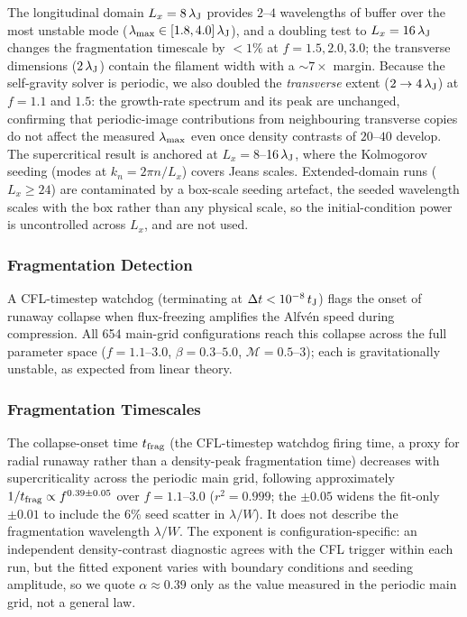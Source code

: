 \documentclass[usenatbib,twoside,twocolumn]{mnras}
\begin{document}
The longitudinal domain $L_x=8\,\lambda_{\rm J}$ provides $2$--$4$ wavelengths of buffer over the most unstable mode ($\lambda_{\rm max}\in[1.8,4.0]\,\lambda_{\rm J}$), and a doubling test to $L_x=16\,\lambda_{\rm J}$ changes the fragmentation timescale by $<1\%$ at $f=1.5,2.0,3.0$; the transverse dimensions ($2\,\lambda_{\rm J}$) contain the filament width with a $\sim7\times$ margin. Because the self-gravity solver is periodic, we also doubled the \emph{transverse} extent ($2\to4\,\lambda_{\rm J}$) at $f=1.1$ and $1.5$: the growth-rate spectrum and its peak are unchanged, confirming that periodic-image contributions from neighbouring transverse copies do not affect the measured $\lambda_{\rm max}$ even once density contrasts of $20$--$40$ develop. The supercritical result is anchored at $L_x=8$--$16\,\lambda_{\rm J}$, where the Kolmogorov seeding (modes at $k_n=2\pi n/L_x$) covers Jeans scales. Extended-domain runs ($L_x\geq24$) are contaminated by a box-scale seeding artefact, the seeded wavelength scales with the box rather than any physical scale, so the initial-condition power is uncontrolled across $L_x$, and are not used.

\subsubsection{Fragmentation Detection}

A CFL-timestep watchdog (terminating at $\Delta t<10^{-8}\,t_{\rm J}$) flags the onset of runaway collapse when flux-freezing amplifies the Alfv\'en speed during compression. All 654 main-grid configurations reach this collapse across the full parameter space ($f=1.1$--$3.0$, $\beta=0.3$--$5.0$, $\mathcal{M}=0.5$--$3$); each is gravitationally unstable, as expected from linear theory.

\subsubsection{Fragmentation Timescales}

The collapse-onset time $t_{\rm frag}$ (the CFL-timestep watchdog firing time, a proxy for radial runaway rather than a density-peak fragmentation time) decreases with supercriticality across the periodic main grid, following approximately $1/t_{\rm frag}\propto f^{0.39\pm0.05}$ over $f=1.1$--$3.0$ ($r^2=0.999$; the $\pm0.05$ widens the fit-only $\pm0.01$ to include the 6\% seed scatter in $\lambda/W$). It does not describe the fragmentation wavelength $\lambda/W$. The exponent is configuration-specific: an independent density-contrast diagnostic agrees with the CFL trigger within each run, but the fitted exponent varies with boundary conditions and seeding amplitude, so we quote $\alpha\approx0.39$ only as the value measured in the periodic main grid, not a general law.
\end{document}
